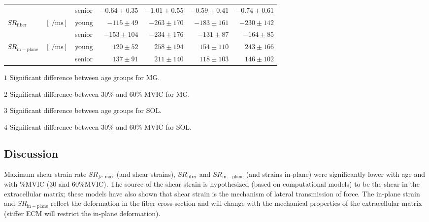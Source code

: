 \begin{table}[!htb]
\begin{center}
\begin{threeparttable}
\begin{tabular}{@{}lclrrrr@{}}
                  											&                   							     				& senior    & $-0.64 \pm 0.35$   & $-1.01 \pm 0.55$  &  $-0.59 \pm 0.41$  & $-0.74 \pm 0.61$   \\[4pt]
\multirow{2}{*}{$SR_{\mathrm{fiber}}$}\tnote{$2$, $3$}		& \multirow{2}{*}{$\left[\SI{}{\per\milli\second}\right]$} 		& young     & $-115 \pm 49$  	& $-263 \pm 170$   &  $-183 \pm 161$   & $-230 \pm 142$  \\
                  											&                   							     				& senior    & $-153 \pm 104$  	& $-234 \pm 176$   &  $-131 \pm 87$    & $-164 \pm 85$  \\[4pt]
\multirow{2}{*}{$SR_{\mathrm{in-plane}}$}\tnote{$2$, $3$}	& \multirow{2}{*}{$\left[\SI{}{\per\milli\second}\right]$} 		& young     & $120 \pm 52$   	& $258 \pm 194$    &  $154 \pm 110$    & $243 \pm 166$   \\
                  											&                   							     				& senior    & $137 \pm 91$   	& $211 \pm 140$    &  $118 \pm 103$    & $146 \pm 102$   \\ \midrule[0.3pt]\bottomrule[1pt]
\end{tabular}
\begin{tablenotes}[flushleft]\footnotesize
\item[$1$] Significant difference between age groups for MG.
\item[$2$] Significant difference between 30\% and 60\% MVIC for MG.
\item[$3$] Significant difference between age groups for SOL.
\item[$4$] Significant difference between 30\% and 60\% MVIC for SOL.
\end{tablenotes}
\end{threeparttable}
\end{center}
\vspace{-0.2cm}
\end{table}
\subsection{Discussion}
Maximum shear strain rate $SR_{fc\_\,\mathrm{max}}$ (and shear strains), $SR_\mathrm{fiber}$ and $SR_\mathrm{in-plane}$ (and strains in-plane) were significantly lower with age and with \%MVIC (30 and 60\%MVIC). 
The source of the shear strain is hypothesized (based on computational models) to be the shear in the extracellular matrix; these models have also shown that shear strain is the mechanism of lateral transmission of force. 
The in-plane strain and $SR_\mathrm{in-plane}$ reflect the deformation in the fiber cross-section and will change with the mechanical properties of the extracellular matrix (stiffer ECM will restrict the in-plane deformation). 
